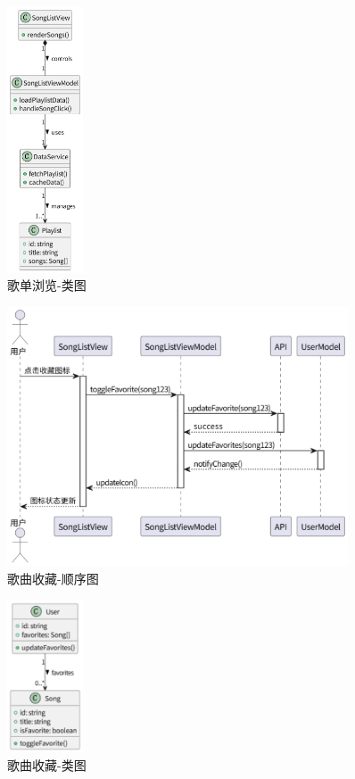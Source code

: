 \documentclass{base}
\begin{document}
\begin{figure}[H]
    \centering
    \includegraphics[width=0.2\textwidth]{images/5-4.png}
    \caption{歌单浏览-类图}
\end{figure}
\begin{figure}[H]
    \centering
    \includegraphics[width=0.9\textwidth]{images/5-5.png}
    \caption{歌曲收藏-顺序图}
\end{figure}
\begin{figure}[H]
    \centering
    \includegraphics[width=0.2\textwidth]{images/5-6.png}
    \caption{歌曲收藏-类图}
\end{figure}
\end{document}
